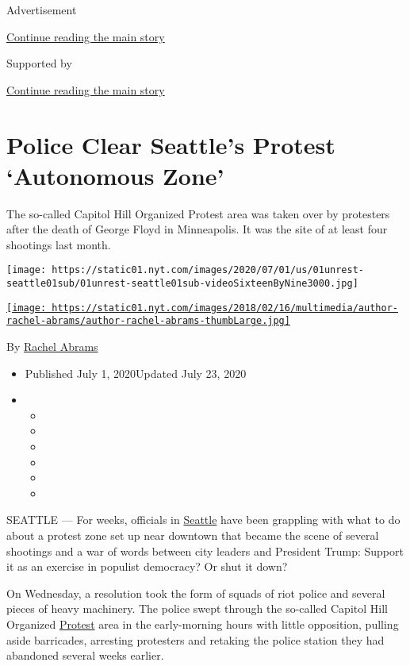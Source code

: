 Advertisement

\protect\hyperlink{after-top}{Continue reading the main story}

Supported by

\protect\hyperlink{after-sponsor}{Continue reading the main story}

\hypertarget{police-clear-seattles-protest-autonomous-zone}{%
\section{Police Clear Seattle's Protest `Autonomous
Zone'}\label{police-clear-seattles-protest-autonomous-zone}}

The so-called Capitol Hill Organized Protest area was taken over by
protesters after the death of George Floyd in Minneapolis. It was the
site of at least four shootings last month.

\texttt{[image: https://static01.nyt.com/images/2020/07/01/us/01unrest-seattle01sub/01unrest-seattle01sub-videoSixteenByNine3000.jpg]}

\href{https://www.nytimes.com/by/rachel-abrams}{\texttt{[image: https://static01.nyt.com/images/2018/02/16/multimedia/author-rachel-abrams/author-rachel-abrams-thumbLarge.jpg]}}

By \href{https://www.nytimes.com/by/rachel-abrams}{Rachel Abrams}

\begin{itemize}
\item
  Published July 1, 2020Updated July 23, 2020
\item
  \begin{itemize}
  \item
  \item
  \item
  \item
  \item
  \item
  \end{itemize}
\end{itemize}

SEATTLE --- For weeks, officials in
\href{https://www.nytimes.com/2020/07/23/us/seattle-protests-feds.html}{Seattle}
have been grappling with what to do about a protest zone set up near
downtown that became the scene of several shootings and a war of words
between city leaders and President Trump: Support it as an exercise in
populist democracy? Or shut it down?

On Wednesday, a resolution took the form of squads of riot police and
several pieces of heavy machinery. The police swept through the
so-called Capitol Hill Organized
\href{https://www.nytimes.com/2020/07/23/us/seattle-protests-feds.html}{Protest}
area in the early-morning hours with little opposition, pulling aside
barricades, arresting protesters and retaking the police station they
had abandoned several weeks earlier.

